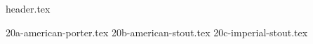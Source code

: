 \clearpage
{}
\divisorLine
{header.tex}
\begin{multicols*}{2}
{20a-american-porter.tex}
{20b-american-stout.tex}
{20c-imperial-stout.tex}
\end{multicols*}